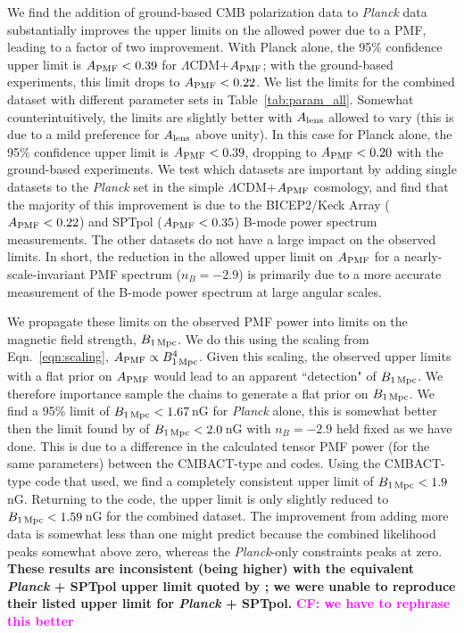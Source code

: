 \documentclass[apj]{emulateapj}
\newcommand{\apmf}{\ensuremath{A_{\rm PMF}}}
\newcommand{\bpmf}{\ensuremath{B_{\rm 1\,Mpc}}}
\newcommand{\alens}{\ensuremath{A_{\rm lens}}}
\newcommand{\lcdm}{\ensuremath{\Lambda}CDM}
\newcommand{\planck}{{\sl Planck}}
\newcommand{\bicepkeck}{BICEP2/Keck Array}
\newcommand{\sptpol}{SPTpol}
\begin{document}
We find the addition of ground-based CMB polarization data to \planck{} data substantially improves the upper limits on the allowed power due to a PMF, leading to a factor of two improvement. 
With Planck alone, the 95\% confidence upper limit is $\apmf <  \upperAplk$ for \lcdm{}+\apmf{}; with the ground-based experiments, this limit drops to $\apmf <  \upperAall$. 
We list the limits for the combined dataset  with different parameter sets in Table~\ref{tab:param_all}. 
Somewhat counterintuitively, the limits are slightly better with \alens{} allowed to vary (this is due to a mild preference for \alens{} above unity). 
In this case for  Planck alone, the 95\% confidence upper limit is $\apmf <  \upperAplkalens$, dropping to $\apmf <  \upperAallalens$ with the ground-based experiments. 
We test which datasets are important by adding single datasets to the \planck{} set in the simple \lcdm{}+\apmf{} cosmology, and find that the majority of this improvement is due to the \bicepkeck{} ($\apmf <  \upperAbicep$) and \sptpol{} ($\apmf <  \upperAsptpol$) B-mode power spectrum measurements. 
The other datasets do not have a large impact on the observed limits. 
In short, the reduction in the allowed upper limit on \apmf{} for a nearly-scale-invariant PMF spectrum ($n_B=-2.9$) is primarily due to a more accurate measurement of the B-mode power spectrum at large angular scales. 

We propagate these limits on the observed PMF power into limits on the magnetic field strength, \bpmf. 
We do this using the scaling from Eqn.~\ref{eqn:scaling}, $\apmf \propto \bpmf^4$. 
Given this scaling, the observed upper limits with a flat prior on \apmf{} would lead to an apparent ``detection" of \bpmf. 
We therefore importance sample the chains to generate a flat prior on \bpmf. 
We find a 95\% limit of $\bpmf < \upperBplk$\,nG for \planck{} alone,
this is somewhat better then the limit found by \citet{planck15-19} of $\bpmf < 2.0$\,nG with $n_B=-2.9$ held fixed as we have done. This is due to a difference in the calculated tensor PMF power (for the same parameters) between the CMBACT-type and \citet{zucca16} codes. Using the CMBACT-type code that \citet{planck15-19} used, we find a completely consistent upper limit of $\bpmf < 1.9$\,nG. 
Returning to the  \citet{zucca16} code, the upper limit is only slightly reduced to $\bpmf < \upperBall$\,nG for the combined dataset. 
The improvement from adding more data is somewhat less than one might predict because the combined likelihood peaks somewhat above zero, whereas the \planck{}-only constraints peaks at zero. 
\textbf{These results are inconsistent (being higher) with the equivalent \planck{} + \sptpol{} upper limit quoted by \citet{zucca16}; we were unable to reproduce their listed upper limit for \planck{} + \sptpol{}.}  \textbf{\textcolor{magenta}{CF: we have to rephrase this better}}
\end{document}
